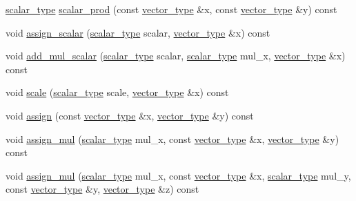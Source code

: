 \begin{DoxyCompactItemize}
\item 
\hyperlink{structcpu__vector__operations_aca6b216aa1fb172df83d98350e94fd61}{scalar\-\_\-type} \hyperlink{structcpu__vector__operations_a4c4fcf653cf773cb4819add09dbd1e49}{scalar\-\_\-prod} (const \hyperlink{structcpu__vector__operations_a1962836df596ce262704d208e9a6d8f9}{vector\-\_\-type} \&x, const \hyperlink{structcpu__vector__operations_a1962836df596ce262704d208e9a6d8f9}{vector\-\_\-type} \&y) const 
\item 
void \hyperlink{structcpu__vector__operations_a2efc001178974db349c1ecbc6a60a98f}{assign\-\_\-scalar} (\hyperlink{structcpu__vector__operations_aca6b216aa1fb172df83d98350e94fd61}{scalar\-\_\-type} scalar, \hyperlink{structcpu__vector__operations_a1962836df596ce262704d208e9a6d8f9}{vector\-\_\-type} \&x) const 
\item 
void \hyperlink{structcpu__vector__operations_a2a20e02394094c974f96f4e9063fb649}{add\-\_\-mul\-\_\-scalar} (\hyperlink{structcpu__vector__operations_aca6b216aa1fb172df83d98350e94fd61}{scalar\-\_\-type} scalar, \hyperlink{structcpu__vector__operations_aca6b216aa1fb172df83d98350e94fd61}{scalar\-\_\-type} mul\-\_\-x, \hyperlink{structcpu__vector__operations_a1962836df596ce262704d208e9a6d8f9}{vector\-\_\-type} \&x) const 
\item 
void \hyperlink{structcpu__vector__operations_a5b482595642484b8c2d9311705645e1a}{scale} (\hyperlink{structcpu__vector__operations_aca6b216aa1fb172df83d98350e94fd61}{scalar\-\_\-type} scale, \hyperlink{structcpu__vector__operations_a1962836df596ce262704d208e9a6d8f9}{vector\-\_\-type} \&x) const 
\item 
void \hyperlink{structcpu__vector__operations_aee016bc7ac6cc3a7149d3444e5b0ac57}{assign} (const \hyperlink{structcpu__vector__operations_a1962836df596ce262704d208e9a6d8f9}{vector\-\_\-type} \&x, \hyperlink{structcpu__vector__operations_a1962836df596ce262704d208e9a6d8f9}{vector\-\_\-type} \&y) const 
\item 
void \hyperlink{structcpu__vector__operations_aa8a06e53a83c6b3b3e3efddcd75065da}{assign\-\_\-mul} (\hyperlink{structcpu__vector__operations_aca6b216aa1fb172df83d98350e94fd61}{scalar\-\_\-type} mul\-\_\-x, const \hyperlink{structcpu__vector__operations_a1962836df596ce262704d208e9a6d8f9}{vector\-\_\-type} \&x, \hyperlink{structcpu__vector__operations_a1962836df596ce262704d208e9a6d8f9}{vector\-\_\-type} \&y) const 
\item 
void \hyperlink{structcpu__vector__operations_a163796b0326ebdd18f2711469783f1a1}{assign\-\_\-mul} (\hyperlink{structcpu__vector__operations_aca6b216aa1fb172df83d98350e94fd61}{scalar\-\_\-type} mul\-\_\-x, const \hyperlink{structcpu__vector__operations_a1962836df596ce262704d208e9a6d8f9}{vector\-\_\-type} \&x, \hyperlink{structcpu__vector__operations_aca6b216aa1fb172df83d98350e94fd61}{scalar\-\_\-type} mul\-\_\-y, const \hyperlink{structcpu__vector__operations_a1962836df596ce262704d208e9a6d8f9}{vector\-\_\-type} \&y, \hyperlink{structcpu__vector__operations_a1962836df596ce262704d208e9a6d8f9}{vector\-\_\-type} \&z) const 

\end{DoxyCompactItemize}
